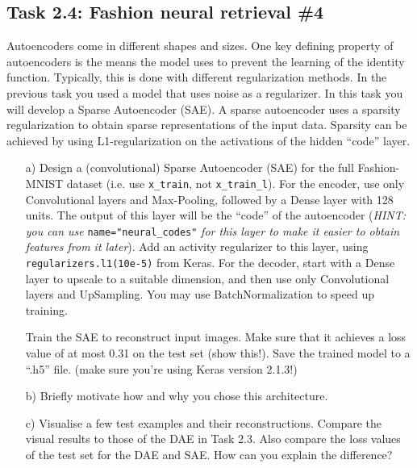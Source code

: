 \documentclass[a4paper,twoside,10pt]{article}
\begin{document}
\subsection*{Task 2.4: Fashion neural retrieval \#4}
Autoencoders come in different shapes and sizes. One key defining property of autoencoders is the means the model uses to prevent the learning of the identity function. Typically, this is done with different regularization methods. In the previous task you used a model that uses noise as a regularizer. In this task you will develop a Sparse Autoencoder (SAE). A sparse autoencoder uses a sparsity regularization to obtain sparse representations of the input data. Sparsity can be achieved by using L1-regularization on the activations of the hidden ``code'' layer.
\begin{itemize}
  \item[a)] Design a (convolutional) Sparse Autoencoder (SAE) for the full Fashion-MNIST dataset (i.e. use \texttt{x\_train}, not \texttt{x\_train\_l}). For the encoder, use only Convolutional layers and Max-Pooling, followed by a Dense layer with 128 units. The output of this layer will be the ``code'' of the autoencoder (\emph{HINT: you can use} \texttt{name="neural\_codes"} \emph{for this layer to make it easier to obtain features from it later}). Add an activity regularizer to this layer, using \texttt{regularizers.l1(10e-5)} from Keras. For the decoder, start with a Dense layer to upscale to a suitable dimension, and then use only Convolutional layers and UpSampling. You may use BatchNormalization to speed up training.

Train the SAE to reconstruct input images. Make sure that it achieves a loss value of at most 0.31 on the test set (show this!). Save the trained model to a ``.h5'' file. (make sure you're using Keras version 2.1.3!)
  \item[b)] Briefly motivate how and why you chose this architecture.
  \item[c)] Visualise a few test examples and their reconstructions. Compare the visual results to those of the DAE in Task 2.3. Also compare the loss values of the test set for the DAE and SAE. How can you explain the difference?
\end{itemize}
\end{document}
